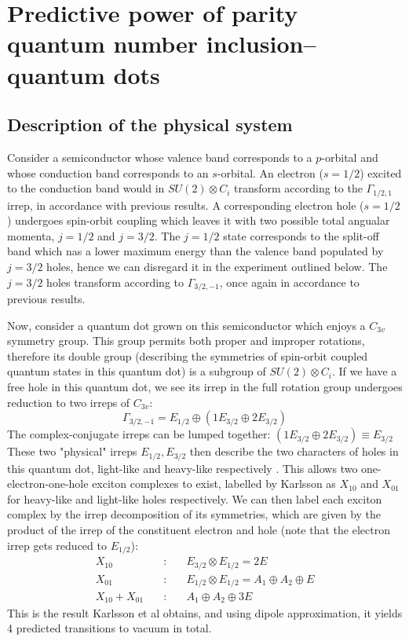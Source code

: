 \documentclass[12pt]{article}
\begin{document}
	\section{Predictive power of parity quantum number inclusion--quantum dots}
	
	\subsection{Description of the physical system}
	Consider a semiconductor whose valence band corresponds to a $p$-orbital and whose conduction band corresponds to an $s$-orbital. An electron ($s=1/2$) excited to the conduction band would in $SU(2)\otimes C_i$ transform according to the $\Gamma_{1/2,1}$ irrep, in accordance with previous results. A corresponding electron hole ($s=1/2$) undergoes spin-orbit coupling which leaves it with two possible total angualar momenta, $j=1/2$ and $j=3/2$. The $j=1/2$ state corresponds to the split-off band which nas a lower maximum energy than the valence band populated by $j=3/2$ holes, hence we can disregard it in the experiment outlined below. The $j=3/2$ holes transform according to $\Gamma_{3/2,-1}$, once again in accordance to previous results.
	
	Now, consider a quantum dot grown on this semiconductor which enjoys a $C_{3v}$ symmetry group. This group permits both proper and improper rotations, therefore its double group (describing the symmetries of spin-orbit coupled quantum states in this quantum dot) is a subgroup of $SU(2)\otimes C_i$. If we have a free hole in this quantum dot, we see its irrep in the full rotation group undergoes reduction to two irreps of $C_{3v}$:
	$$\Gamma_{3/2,-1}=E_{1/2}\oplus (1E_{3/2}\oplus 2E_{3/2})$$
	The complex-conjugate irreps can be lumped together: $(1E_{3/2}\oplus 2E_{3/2})\equiv E_{3/2}$
	These two "physical" irreps $E_{1/2}, E_{3/2}$ then describe the two characters of holes in this quantum dot, light-like and heavy-like respectively \cite{karlsson}. This allows two one-electron-one-hole exciton complexes to exist, labelled by Karlsson as $X_{10}$ and $X_{01}$ for heavy-like and light-like holes respectively. We can then label each exciton complex by the irrep decomposition of its symmetries, which are given by the product of the irrep of the constituent electron and hole (note that the electron irrep gets reduced to $E_{1/2}$):
	\begin{eqnarray*}
	X_{10}\quad &:& \quad E_{3/2} \otimes E_{1/2} = 2E\\
	X_{01}\quad &:& \quad E_{1/2} \otimes E_{1/2} = A_1 \oplus A_2 \oplus E\\
	X_{10} + X_{01} \quad &:& \quad A_1 \oplus A_2 \oplus 3E
	\end{eqnarray*}
	This is the result Karlsson et al obtains, and using dipole approximation, it yields 4 predicted transitions to vacuum in total.
\end{document}
